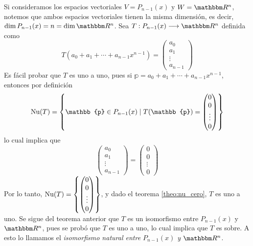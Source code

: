 \newpage

\begin{example}
    Si consideramos los espacios vectoriales $V = P_{n-1}(x)$ y $W = \RR[n]$, notemos que ambos espacios vectoriales tienen la misma dimensión, es decir, $\Dim P_{n-1}(x) = n = \Dim \RR[n]$. Sea $T: P_{n-1}(x) \longrightarrow \RR[n]$ definida como
    $$T(a_0 + a_1 + \cdots + a_{n-1}x^{n-1}) = \begin{pmatrix} a_0 \\ a_1 \\ \vdots \\ a_{n-1} \end{pmatrix}$$
    Es fácil probar que $T$ es uno a uno, pues si $\mathbb{p} = a_0 + a_1 + \cdots + a_{n-1}x^{n-1}$, entonces por definición
    $$\Nuc(T) = \left\{ \mathbb{p} \in P_{n-1}(x) \mid T(\mathbb{p}) = \begin{pmatrix} 0 \\ 0 \\ \vdots \\ 0 \end{pmatrix} \right\}$$
    lo cual implica que
    $$\begin{pmatrix}
        a_0 \\
        a_1 \\
        \vdots \\
        a_{n-1}
    \end{pmatrix} = \begin{pmatrix}
        0 \\
        0 \\
        \vdots \\
        0
    \end{pmatrix}$$
    Por lo tanto, $\displaystyle \operatorname{Nu}(T) = \left\{ \begin{pmatrix}
        0 \\
        0 \\
        \vdots \\
        0
    \end{pmatrix} \right\}$, y dado el teorema \ref{theo:nu_cero}, $T$ es uno a uno. Se sigue del teorema anterior que $T$ es un isomorfismo entre $P_{n-1}(x)$ y $\RR[n]$, pues se probó que $T$ es uno a uno, lo cual implica que $T$ es sobre. A esto lo llamamos el \emph{isomorfismo natural entre $P_{n-1}(x)$ y $\RR[n]$}.
\end{example}

